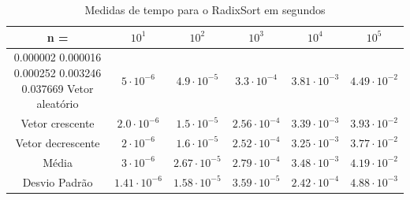 \documentclass{article}
\begin{document}
\begin{table}
    \begin{tabular}{c|c|c|c|c|c}
        n = & $10^{1}$ & $10^{2}$ & $10^{3}$ & $10^{4}$ & $10^{5}$ \\ 
        \hline
            0.000002    0.000016    0.000252    0.003246    0.037669
        Vetor aleatório & $5\cdot 10^{-6}$ & $4.9\cdot 10^{-5}$ & $3.3\cdot 10^{-4}$ & $3.81\cdot 10^{-3}$ & $4.49\cdot 10^{-2}$ \\
        \hline
        Vetor crescente & $2.0\cdot10^{-6}$ & $1.5\cdot 10^{-5}$ & $2.56\cdot 10^{-4}$ & $3.39\cdot 10^{-3}$ & $3.93\cdot 10^{-2}$\\
        \hline
        Vetor decrescente & $2\cdot10^{-6}$ & $1.6\cdot 10^{-5}$ & $2.52\cdot 10^{-4}$ & $3.25\cdot 10^{-3}$ & $3.77\cdot 10^{-2}$\\
        \hline
        Média & $3\cdot 10^{-6}$ & $2.67\cdot 10^{-5}$ & $2.79\cdot10^{-4}$ & $3.48\cdot 10^{-3}$ & $4.19\cdot 10^{-2}$ \\
        \hline
        Desvio Padrão & $1.41\cdot 10^{-6}$ & $1.58\cdot 10^{-5}$ & $3.59\cdot 10^{-5}$ & $2.42\cdot 10^{-4}$ & $4.88\cdot 10^{-3}$ \\
    \end{tabular}
    \caption{Medidas de tempo para o RadixSort em segundos}
\end{table}\par
%
\end{document}

